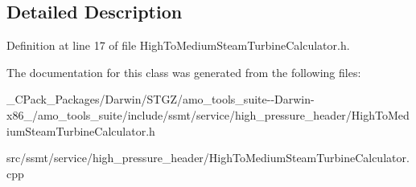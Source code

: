 \subsection{Detailed Description}


Definition at line 17 of file High\+To\+Medium\+Steam\+Turbine\+Calculator.\+h.



The documentation for this class was generated from the following files\+:\begin{DoxyCompactItemize}
\item 
\+\_\+\+C\+Pack\+\_\+\+Packages/\+Darwin/\+S\+T\+G\+Z/amo\+\_\+tools\+\_\+suite-\/-\/\+Darwin-\/x86\+\_/amo\+\_\+tools\+\_\+suite/include/ssmt/service/high\+\_\+pressure\+\_\+header/High\+To\+Medium\+Steam\+Turbine\+Calculator.\+h\item 
src/ssmt/service/high\+\_\+pressure\+\_\+header/High\+To\+Medium\+Steam\+Turbine\+Calculator.\+cpp\end{DoxyCompactItemize}
